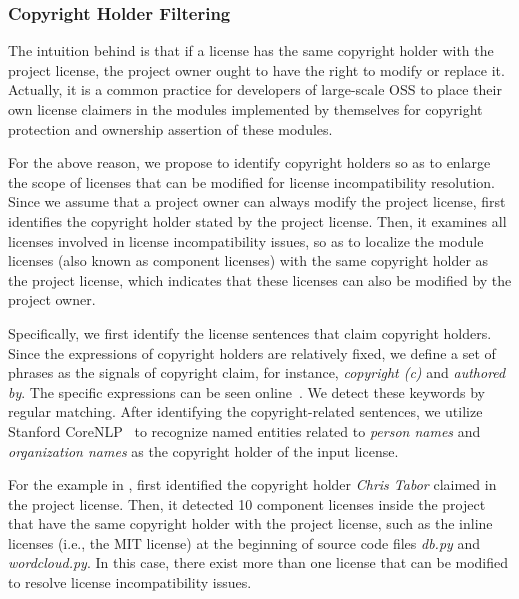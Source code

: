 \subsubsection{{Copyright Holder Filtering}}
 The intuition behind is that if a license has the same copyright holder with the project license, the project owner ought to have the right to modify or replace it. 
Actually, it is a common practice for developers of large-scale OSS to place their own license claimers in the modules implemented by themselves for copyright protection and ownership assertion of these modules. 

For the above reason, we propose to identify copyright holders so as to enlarge the scope of licenses that can be modified for license incompatibility resolution. Since we assume that a project owner can always modify the project license, \tool first identifies the copyright holder stated by the project license. Then, it examines all licenses involved in license incompatibility issues, so as to localize the module licenses (also known as component licenses) with the same copyright holder as the project license, which indicates that these licenses can also be modified by the project owner. 

Specifically, we first identify the license sentences that claim copyright holders. Since the expressions of copyright holders are relatively fixed, we define a set of phrases as the signals of copyright claim, for instance, \textit{copyright (c)} and \textit{authored by}. The specific expressions can be seen online~\cite{ourwebsite}. We detect these keywords by regular matching. 
After identifying the copyright-related sentences, we utilize Stanford CoreNLP~\cite{url-corenlp} to recognize named entities related to \textit{person names} and \textit{organization names} as the copyright holder of the input license.


For the example in , \tool first identified the copyright holder \textit{Chris Tabor} claimed in the project license. Then, it detected 10 component licenses inside the project that have the same copyright holder with the project license, such as the inline licenses (i.e., the MIT license) at the beginning of source code files \textit{db.py} and \textit{wordcloud.py}. In this case, there exist more than one license that can be modified to resolve license incompatibility issues. 





